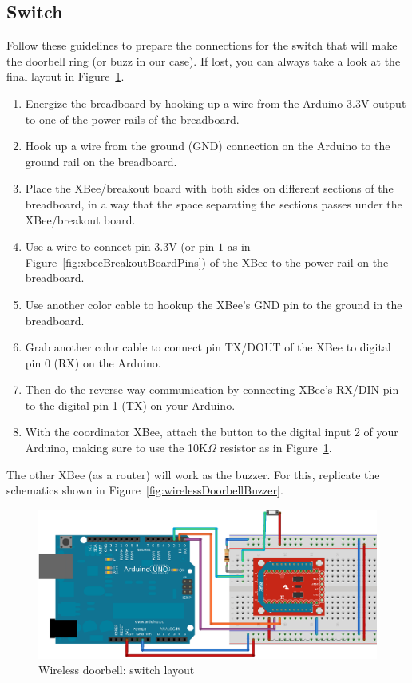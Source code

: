 \subsection{Switch}
Follow these guidelines to prepare the connections for the switch that will make the doorbell ring (or buzz in our case). If lost, you can always take a look at the final layout in Figure~\ref{fig:wirelessDoorbellSwitch}.

\begin{enumerate}
  \item Energize the breadboard by hooking up a {\color{red}{red}} wire from the Arduino $3.3$V output to one of the power rails of the breadboard.
  \item Hook up a {\color{blue}{blue}} wire from the ground (GND) connection on the Arduino to the ground rail on the breadboard.
  \item Place the XBee/breakout board with both sides on different sections of the breadboard, in a way that the space separating the sections passes under the XBee/breakout board.
  \item Use a {\color{red}{red}} wire to connect pin $3.3$V (or pin $1$ as in Figure~\ref{fig:xbeeBreakoutBoardPins}) of the XBee to the power rail on the breadboard.
  \item Use another color cable to hookup the XBee's GND pin to the ground in the breadboard.
  \item Grab another color cable to connect pin TX/DOUT of the XBee to digital pin 0 (RX) on the Arduino.
  \item Then do the reverse way communication by connecting XBee's RX/DIN pin to the digital pin 1 (TX) on your Arduino.
  \item With the coordinator XBee, attach the button to the digital input 2 of your Arduino, making sure to use the 10K$\Omega$ resistor as in Figure~\ref{fig:wirelessDoorbellSwitch}.
\end{enumerate}

The other XBee (as a router) will work as the buzzer. For this, replicate the schematics shown in Figure~\ref{fig:wirelessDoorbellBuzzer}.

\begin{figure}[htbp]
  \centering
  \includegraphics[width=\linewidth]{figures/doorbellSwitch-NEW.eps}
  \caption{Wireless doorbell: switch layout
  \label{fig:wirelessDoorbellSwitch}}
\end{figure}

